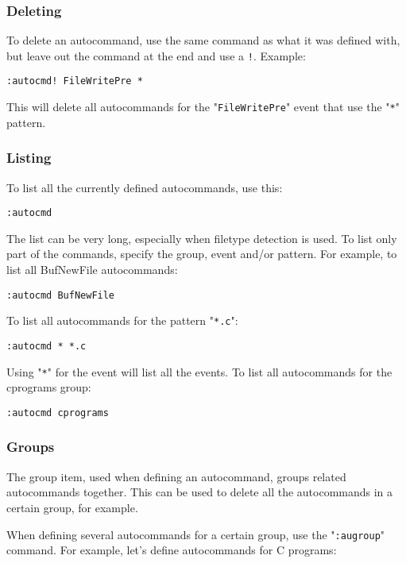 {\subsubsection{Deleting}
To delete an autocommand, use the same command as what it was defined with, but leave out the {command} at the end and use a \verb;!;.
Example:

\begin{Verbatim}[samepage=true]
 :autocmd! FileWritePre *
\end{Verbatim}

This will delete all autocommands for the "\verb!FileWritePre!" event that use the "\verb!*!" pattern.
\subsubsection{Listing}
To list all the currently defined autocommands, use this:

\begin{Verbatim}[samepage=true]
 :autocmd
\end{Verbatim}

The list can be very long, especially when filetype detection is used.
To list only part of the commands, specify the group, event and/or pattern.
For example, to list all BufNewFile autocommands:

\begin{Verbatim}[samepage=true]
 :autocmd BufNewFile
\end{Verbatim}

To list all autocommands for the pattern "\verb!*.c!":

\begin{Verbatim}[samepage=true]
 :autocmd * *.c
\end{Verbatim}

Using "\verb!*!" for the event will list all the events.
To list all autocommands for the cprograms group:

\begin{Verbatim}[samepage=true]
 :autocmd cprograms
\end{Verbatim}

\subsubsection{Groups}
The {group} item, used when defining an autocommand, groups related autocommands together.
This can be used to delete all the autocommands in a certain group, for example.

When defining several autocommands for a certain group, use the "\verb!:augroup!" command.
For example, let's define autocommands for C programs:

}
